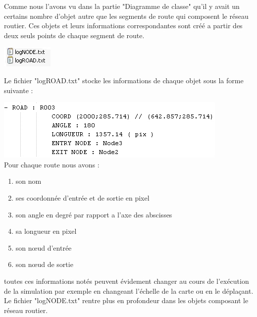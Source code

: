 \documentclass[a4paper,11pt]{article}
\begin{document}
Comme nous l'avons vu dans la partie "Diagramme de classe" qu'il y avait un certains nombre d'objet autre que les segments de route qui composent le réseau routier. Ces objets et leurs informations correspondantes sont créé a partir des deux seuls points de chaque segment de route. 

\includegraphics[scale=0.8]{imgDiverses/logFile.png}\vspace{0.25cm}

Le fichier "logROAD.txt" stocke les informations de chaque objet sous la forme suivante :\vspace{0.25cm}

\includegraphics[scale=0.8]{imgDiverses/logRoad.png}\\

Pour chaque route nous avons :
\begin{enumerate}[label=-]
\vspace{-0.25cm}
\item son nom
\vspace{-0.25cm}
\item ses coordonnée d'entrée et de sortie en pixel
\vspace{-0.25cm}
\item son angle en degré par rapport a l'axe des abscisses 
\vspace{-0.25cm}
\item sa longueur en pixel
\vspace{-0.25cm}
\item son n\oe{}ud d'entrée
\vspace{-0.25cm}
\item son n\oe{}ud de sortie
\vspace{-0.25cm}
\end{enumerate}

toutes ces informations notés peuvent évidement changer au cours de l'exécution de la simulation par exemple en changeant l'échelle de la carte ou en le déplaçant. \\

Le fichier "logNODE.txt" rentre plus en profondeur dans les objets composant le réseau routier. 
\end{document}

